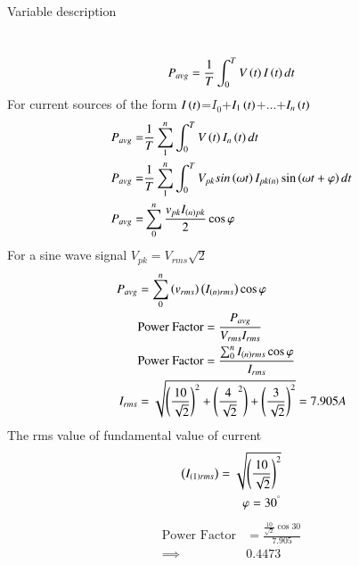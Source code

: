 \documentclass[journal,12pt,twocolumn]{IEEEtran}
\theoremstyle{remark}
\begin{document}
\solution\\
\begin{table}[h]
    \centering
    
    \caption{Variable description}
    \label{tab:GATE.2022.EE.33.1}
\end{table}\\
\begin{align}
  P_{avg}=\frac{1}{T}\int_{0}^{T}V\left(t\right)I\left(t\right)dt
\end{align}
For current sources of the form $I\left(t\right)$=$I_0$+$I_1\left(t\right)$+...+$I_n\left(t\right)$
\begin{align}
    P_{avg}=&\frac{1}{T}\sum_{1}^{n}\int_{0}^{T}V\left(t\right)I_{n}\left(t\right)dt\\
    P_{avg}=&\frac{1}{T}\sum_{1}^{n}\int_{0}^{T}V_{pk}sin\left(\omega t\right)I_{pk\left(n\right)}\sin\left(\omega t+\varphi\right)dt\\
    P_{avg}=&\sum_{0}^{n}\frac{v_{pk}I_{\left(n\right)pk}}{2}\cos{\varphi}
\end{align}
For a sine wave signal $V_{pk}=V_{rms}\sqrt{2}$
\begin{align}
    P_{avg}&=\sum_{0}^{n}\left(v_{rms}\right)\left(I_{\left(n\right)rms}\right)\cos{\varphi}\\
    &\text{Power Factor}=\frac{P_{avg}}{V_{rms}I_{rms}}\\
    &\text{Power Factor}=\frac{\sum_{0}^{n}I_{\left(n\right)rms}\cos{\varphi}}{I_{rms}}\\
    I_{rms}&=\sqrt{\left(\frac{10}{\sqrt{2}}\right)^2+\left(\frac{4}{\sqrt{2}}^2\right)+\left(\frac{3}{\sqrt{2}}\right)^2}= 7.905A
\end{align}
The rms value of fundamental value of current 
\begin{align}
\left(I_{\left(1\right)rms}\right)=\sqrt{\left(\frac{10}{\sqrt{2}}\right)^2}\\
\varphi=30^{^\circ}
\end{align}
\begin{align}
    \text{Power Factor}&=\frac{\frac{10}{\sqrt{2}}\cos{30}}{7.905}\\
    \implies&0.4473
\end{align}
\end{document}
